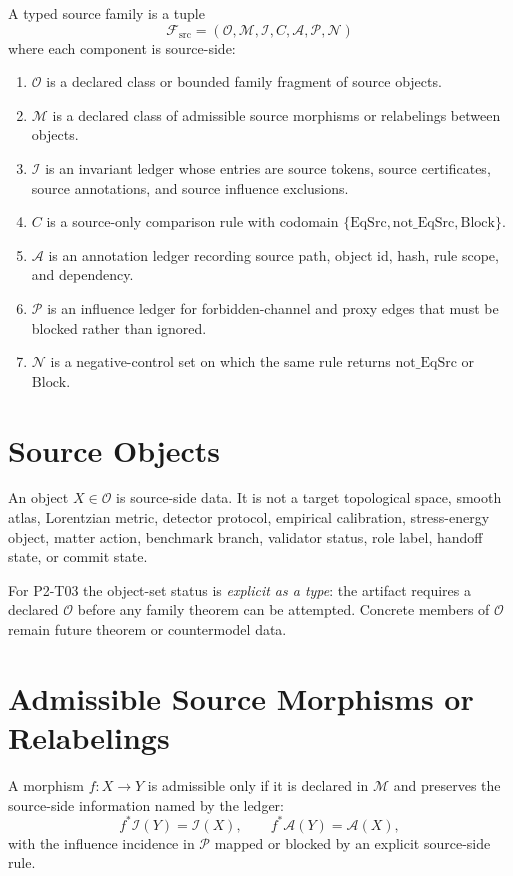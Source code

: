 \documentclass[11pt]{article}
\newcommand{\EqSrc}{\mathrm{EqSrc}}
\newcommand{\Block}{\mathrm{Block}}
\newcommand{\NotEqSrc}{\mathrm{not\_EqSrc}}
\begin{document}
A typed source family is a tuple
\[
  \mathcal{F}_{\mathrm{src}} =
  (\mathcal{O}, \mathcal{M}, \mathcal{I}, C, \mathcal{A},
   \mathcal{P}, \mathcal{N})
\]
where each component is source-side:
\begin{enumerate}[label=(\alph*)]
\item \(\mathcal{O}\) is a declared class or bounded family fragment of source
objects.
\item \(\mathcal{M}\) is a declared class of admissible source morphisms or
relabelings between objects.
\item \(\mathcal{I}\) is an invariant ledger whose entries are source tokens,
source certificates, source annotations, and source influence exclusions.
\item \(C\) is a source-only comparison rule with codomain
\(\{\EqSrc,\NotEqSrc,\Block\}\).
\item \(\mathcal{A}\) is an annotation ledger recording source path, object id,
hash, rule scope, and dependency.
\item \(\mathcal{P}\) is an influence ledger for forbidden-channel and proxy
edges that must be blocked rather than ignored.
\item \(\mathcal{N}\) is a negative-control set on which the same rule returns
\(\NotEqSrc\) or \(\Block\).
\end{enumerate}

\section{Source Objects}

An object \(X \in \mathcal{O}\) is source-side data. It is not a target
topological space, smooth atlas, Lorentzian metric, detector protocol,
empirical calibration, stress-energy object, matter action, benchmark branch,
validator status, role label, handoff state, or commit state.

For P2-T03 the object-set status is \emph{explicit as a type}: the artifact
requires a declared \(\mathcal{O}\) before any family theorem can be attempted.
Concrete members of \(\mathcal{O}\) remain future theorem or countermodel data.

\section{Admissible Source Morphisms or Relabelings}

A morphism \(f:X\to Y\) is admissible only if it is declared in
\(\mathcal{M}\) and preserves the source-side information named by the ledger:
\[
  f^\ast \mathcal{I}(Y) = \mathcal{I}(X), \qquad
  f^\ast \mathcal{A}(Y) = \mathcal{A}(X),
\]
with the influence incidence in \(\mathcal{P}\) mapped or blocked by an
explicit source-side rule.
\end{document}
